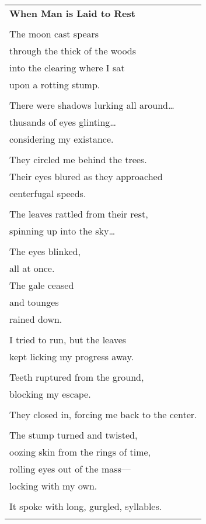 \documentclass{article}
\begin{document}
\begin{center}
\begin{tabular}{l}
\textbf{When Man is Laid to Rest} \\
\\
The moon cast spears \\
through the thick of the woods \\
into the clearing where I sat \\
upon a rotting stump. \\
\\
There were shadows lurking all around\ldots \\
thusands of eyes glinting\ldots \\
considering my existance. \\
\\
They circled me behind the trees. \\
Their eyes blured as they approached \\
centerfugal speeds. \\
\\
The leaves rattled from their rest, \\
spinning up into the sky\ldots \\
\\
The eyes blinked, \\
all at once. \\
The gale ceased \\
and tounges \\
rained down. \\
\\
I tried to run, but the leaves \\
kept licking my progress away. \\
\\
Teeth ruptured from the ground, \\
blocking my escape. \\
\\
They closed in, forcing me back to the center. \\
\\
The stump turned and twisted, \\
oozing skin from the rings of time, \\
rolling eyes out of the mass--- \\
locking with my own. \\
\\
It spoke with long, gurgled, syllables. \\
\\

\end{tabular}
\end{center}
\end{document}

